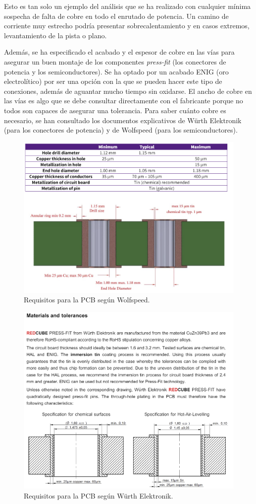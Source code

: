 Esto es tan solo un ejemplo del análisis que se ha realizado con cualquier mínima sospecha de falta de cobre en todo el enrutado de potencia. Un camino de corriente muy estrecho podría presentar sobrecalentamiento y en casos extremos, levantamiento de la pista o plano.

Además, se ha especificado el acabado y el espesor de cobre en las vías para asegurar un buen montaje de los componentes \textit{press-fit} (los conectores de potencia y los semiconductores). Se ha optado por un acabado ENIG (oro electrolítico) por ser una opción con la que se pueden hacer este tipo de conexiones, además de aguantar mucho tiempo sin oxidarse. El ancho de cobre en las vías es algo que se debe consultar directamente con el fabricante porque no todos son capaces de asegurar una tolerancia. Para saber cuánto cobre es necesario, se han consultado los documentos explicativos de Würth Elektronik (para los conectores de potencia) y de Wolfspeed (para los semiconductores).
\begin{figure}[H]
	\centering
	\includegraphics[width=0.7\linewidth]{fig/pressfit-wolfspeed-instructions}
	\caption{Requisitos para la PCB según Wolfspeed.}
\end{figure}
\begin{figure}[H]
	\centering
	\includegraphics[width=0.7\linewidth]{fig/pressfit-wurth-instructions}
	\caption{Requisitos para la PCB según Würth Elektronik.}
\end{figure}

